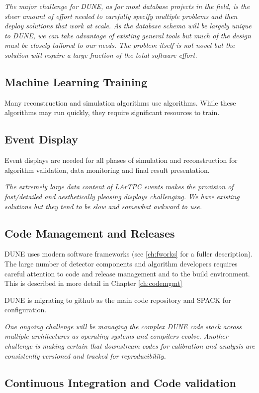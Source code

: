 \documentclass[../main-v1.tex]{subfiles}
\begin{document}
{\it The major challenge for DUNE, as for most database projects in the field, is the sheer amount of effort needed to carefully specify multiple problems and then deploy solutions that work at scale. As the database schema will be largely unique to DUNE, we can take advantage of existing general tools but much of the design must be closely tailored to our needs. The problem itself is not novel but the solution will require a large fraction of the total software effort.}


\subsection{Machine Learning Training} 
Many reconstruction and simulation algorithms use  algorithms.  While these algorithms may run quickly, they   require significant resources to train.  

\subsection{Event Display}
Event displays are needed for all phases of simulation and reconstruction for algorithm validation, data monitoring and final result presentation. 

{\it The extremely large data content of LArTPC events makes the provision of fast/detailed and aesthetically pleasing displays challenging.  We have existing solutions but they tend to be slow and somewhat awkward to use.}

\subsection{Code Management and Releases}
DUNE  uses modern software frameworks (see \ref{ch:fworks} for a fuller description). The large number of detector components and algorithm developers requires careful attention to code and release management and to the build environment.  This is described in more detail in Chapter \ref{ch:codemgmt}

DUNE is migrating to github as the main code repository and SPACK for configuration.  

{\it One ongoing challenge will be managing the complex DUNE code stack across multiple architectures as operating systems and compilers evolve. Another challenge is making certain that downstream codes for calibration and analysis are consistently versioned and tracked for reproducibility.} 

\subsection{Continuous Integration and Code validation}
\end{document}

